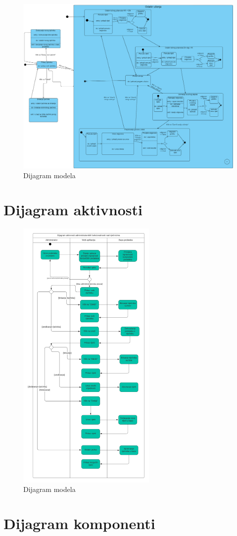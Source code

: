 			
        \begin{figure}[H]
            \includegraphics[width=1.1\textwidth]{dijagrami/Dijagram_stanja.png} 
            \centering
            \caption{Dijagram modela}
            \label{fig:class_diagram}
        \end{figure}			
			
			\eject 
		
		\section{Dijagram aktivnosti}
			
        \begin{figure}[H]
            \includegraphics[width=0.6\textwidth]{dijagrami/Dijagram Aktivnosti.png} 
            \centering
            \caption{Dijagram modela}
            \label{fig:class_diagram}
        \end{figure}	

			\eject
		\section{Dijagram komponenti}
		
			